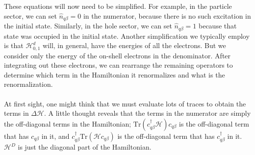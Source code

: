 \documentclass[twoside]{report}
\numberwithin{equation}{section}
\begin{document}
These equations will now need to be simplified. For example, in the particle sector, we can set \(\hat n_{q\beta}=0\) in the numerator, because there is no such excitation in the initial state. Similarly, in  the hole sector, we can set \(\hat n_{q\beta}=1\) because that state was occupied in the initial state. Another simplification we typically employ is that \(\mathcal{H}^d_{0,1}\) will, in general, have the energies of all the electrons. But we consider only the energy of the on-shell electrons in the denominator. After integrating out these electrons, we can rearrange the remaining operators to determine which term in the Hamiltonian it renormalizes and what is the renormalization.
\\\\At first sight, one might think that we must evaluate lots of traces to obtain the terms in \(\Delta \mathcal{H}\). A little thought reveals that the terms in the numerator are simply the off-diagonal terms in the Hamiltonian; \(\text{Tr}\left(c^\dagger_{q\beta}\mathcal{H} \right)c_{q\beta}\) is the off-diagonal term that has \(c_{q\beta}\) in it, and \(c_{q\beta}^\dagger \text{Tr}\left(\mathcal{H} c_{q\beta}\right)\) is the off-diagonal term that has \(c^\dagger_{q\beta}\) in it. \(\mathcal{H}^D\) is just the diagonal part of the Hamiltonian.
\end{document}
